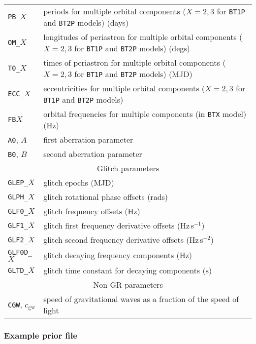 \begin{longtable}{p{}|p{}}
{\tt PB\_}$X$ & periods for multiple orbital components ($X=2,3$ for {\tt BT1P} and {\tt BT2P} models) (days) \\
{\tt OM\_}$X$ & longitudes of periastron for multiple orbital components ($X=2,3$ for {\tt BT1P} and {\tt BT2P} models) (degs) \\
{\tt T0\_}$X$ & times of periastron for multiple orbital components ($X=2,3$ for {\tt BT1P} and {\tt BT2P} models) (MJD) \\
{\tt ECC\_}$X$ & eccentricities for multiple orbital components ($X=2,3$ for {\tt BT1P} and {\tt BT2P} models) \\
{\tt FB}$X$ & orbital frequencies for multiple components (in {\tt BTX} model) (Hz) \\
{\tt A0}, $A$ & first aberration parameter \citep[see e.g.\ Section~2.7.3 of][]{2006MNRAS.372.1549E} \\
{\tt B0}, $B$ & second aberration parameter \citep[see e.g.\ Section~2.7.3 of][]{2006MNRAS.372.1549E} \\
\hline
\multicolumn{2}{c}{Glitch parameters \citep[see][]{2006MNRAS.369..655H,2013MNRAS.429..688Y}} \\
\hline
{\tt GLEP\_}$X$ & glitch epochs (MJD) \\
{\tt GLPH\_}$X$ & glitch rotational phase offsets (rads) \\
{\tt GLF0\_}$X$ & glitch frequency offsets (Hz) \\
{\tt GLF1\_}$X$ & glitch first frequency derivative offsets (Hz\,s$^{-1}$) \\
{\tt GLF2\_}$X$ & glitch second  frequency derivative offsets (Hz\,s$^{-2}$) \\
{\tt GLF0D\_}$X$ & glitch decaying frequency components (Hz) \\
{\tt GLTD\_}$X$ & glitch time constant for decaying components (s) \\
\hline
\multicolumn{2}{c}{Non-GR parameters} \\
\hline
{\tt CGW}, $c_{\text{gw}}$ & speed of gravitational waves as a fraction of the speed of light \\
\hline
\hline
\end{longtable}


\subsubsection{Example prior file}\label{sec:priorfile}

